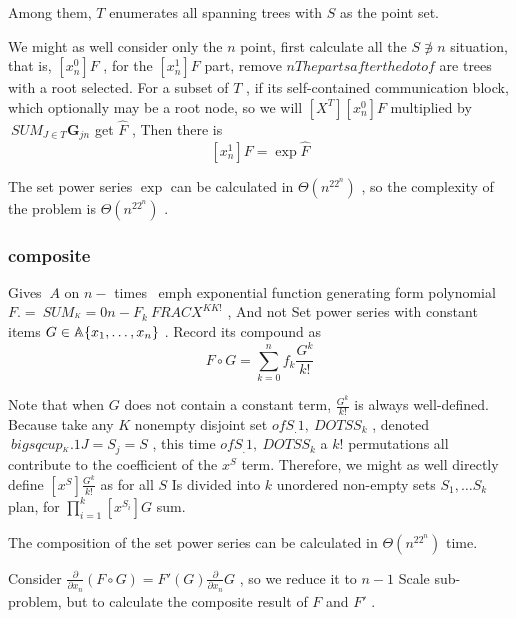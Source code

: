 {\begin { problem }
Among them, $ T $ enumerates all spanning trees with $ S $ as the point set.
\end { problem }

\begin { solution }
We might as well consider only the $ n $ point, first calculate all the $ S \not  \ni n $ situation, that is, $ [x_n^ 0 ]F $ , for the $ [x_n^ 1 ]F $ part, remove $ n The parts after the dot of $ are trees with a root selected. For a subset of $ T $ , if its self-contained communication block, which optionally may be a root node, so we will $ [X ^ T] [x_n ^ 0 ] F $ multiplied by $ \ SUM _ {J \in T} \mathbf G_{jn} $ get $ \widehat F$ , Then there is
$$
[x_n^ 1 ]F = \exp  \widehat F
$$

The set power series $ \exp $ can be calculated in $ \Theta (n^ 22 ^n) $ , so the complexity of the problem is $ \Theta (n^ 22 ^n) $ .
\end { solution }

\subsubsection { composite }

\begin { definition } 
Gives $ \ A $ on $ n- $ times \ emph { exponential function generating } form polynomial $ F. = \ SUM _ ^ {K} = 0 n-F_k \ FRAC {X} ^ {K K!} $ , And not Set power series with constant items $ G \in   \mathbb A\{ x_ 1 , \dots , x_n \} $ . Record its compound as
$$
F \circ G = \sum _{k=0}^n f_k \frac {G^k}{k!}
$$

Note that when $ G $ does not contain a constant term, $ \frac {G^k}{k!} $ is always well-defined. Because take any $ K $ nonempty disjoint set $ of S_ . 1 , \ DOTS S_k $ , denoted $ \ bigsqcup _ ^ {K}. 1 J = S_j = S $ , this time $ of S_ . 1 , \ DOTS S_k $ a $ k! $ permutations all contribute to the coefficient of the $ x^S $ term. Therefore, we might as well directly define $ [x^S] \frac {G^k}{k!} $ as for all $ S$ Is divided into $ k $ unordered non-empty sets $ S_ 1 , \dots S_k $ plan, for $ \prod _{i=1}^k [x^{S_i}]G $ sum.
\end { definition }

\begin { theorem } \label { setcomp }
The composition of the set power series can be calculated in $ \Theta (n^ 22 ^n) $ time.
\end { theorem }

Consider $ \frac { \partial }{ \partial x_n} (F \circ G) = F'(G) \frac { \partial }{ \partial x_n} G $ , so we reduce it to $ n- 1 $ Scale sub-problem, but to calculate the composite result of $ F $ and $ F' $ .

}
